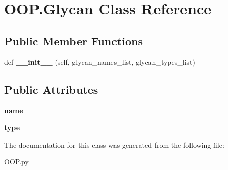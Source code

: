 \hypertarget{class_o_o_p_1_1_glycan}{}\section{O\+O\+P.\+Glycan Class Reference}
\label{class_o_o_p_1_1_glycan}
\subsection*{Public Member Functions}
\begin{DoxyCompactItemize}
\item 
\mbox{\label{class_o_o_p_1_1_glycan_aa78e9792b1b12ef921e3171232d3c9f7}} 
def {\bfseries \+\_\+\+\_\+init\+\_\+\+\_\+} (self, glycan\+\_\+names\+\_\+list, glycan\+\_\+types\+\_\+list)
\end{DoxyCompactItemize}
\subsection*{Public Attributes}
\begin{DoxyCompactItemize}
\item 
\mbox{\label{class_o_o_p_1_1_glycan_af859e988f72ae5e659781e54300b866e}} 
{\bfseries name}
\item 
\mbox{\label{class_o_o_p_1_1_glycan_a8d4b21fb3d8e47a12e356ffaf5851222}} 
{\bfseries type}
\end{DoxyCompactItemize}


The documentation for this class was generated from the following file\+:\begin{DoxyCompactItemize}
\item 
O\+O\+P.\+py\end{DoxyCompactItemize}

